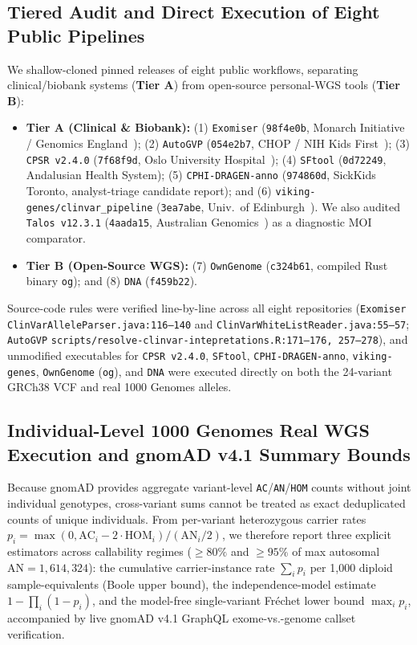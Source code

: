 \documentclass[11pt,letterpaper]{article}
\begin{document}
\subsection{Tiered Audit and Direct Execution of Eight Public Pipelines}
We shallow-cloned pinned releases of eight public workflows, separating clinical/biobank systems (\textbf{Tier A}) from open-source personal-WGS tools (\textbf{Tier B}):
\begin{itemize}\setlength{\itemsep}{1.5pt}
  \item \textbf{Tier A (Clinical \& Biobank):} (1) \texttt{Exomiser} (\texttt{98f4e0b}, Monarch Initiative / Genomics England~\citep{smedley2015exomiser}); (2) \texttt{AutoGVP} (\texttt{054e2b7}, CHOP / NIH Kids First~\citep{kim2024autogvp}); (3) \texttt{CPSR v2.4.0} (\texttt{7f68f9d}, Oslo University Hospital~\citep{nakken2021cpsr}); (4) \texttt{SFtool} (\texttt{0d72249}, Andalusian Health System); (5) \texttt{CPHI-DRAGEN-anno} (\texttt{974860d}, SickKids Toronto, analyst-triage candidate report); and (6) \texttt{viking-genes/clinvar\_pipeline} (\texttt{3ea7abe}, Univ.\ of Edinburgh~\citep{kerr2025viking}). We also audited \texttt{Talos v12.3.1} (\texttt{4aada15}, Australian Genomics~\citep{welland2026talos}) as a diagnostic MOI comparator.
  \item \textbf{Tier B (Open-Source WGS):} (7) \texttt{OwnGenome} (\texttt{c324b61}, compiled Rust binary \texttt{og}); and (8) \texttt{DNA} (\texttt{f459b22}).
\end{itemize}
Source-code rules were verified line-by-line across all eight repositories (\texttt{Exomiser} \texttt{ClinVarAlleleParser.java:116--140} and \texttt{ClinVarWhiteListReader.java:55--57}; \texttt{AutoGVP} \texttt{scripts/\allowbreak resolve-clinvar-intepretations.R:171--176, 257--278}), and unmodified executables for \texttt{CPSR v2.4.0}, \texttt{SFtool}, \texttt{CPHI-DRAGEN-anno}, \texttt{viking-genes}, \texttt{OwnGenome} (\texttt{og}), and \texttt{DNA} were executed directly on both the 24-variant GRCh38 VCF and real 1000 Genomes alleles.

\subsection{Individual-Level 1000 Genomes Real WGS Execution and gnomAD v4.1 Summary Bounds}
Because gnomAD provides aggregate variant-level \texttt{AC}/\texttt{AN}/\texttt{HOM} counts without joint individual genotypes, cross-variant sums cannot be treated as exact deduplicated counts of unique individuals. From per-variant heterozygous carrier rates $p_i = \max(0,\text{AC}_i - 2\cdot\text{HOM}_i)/(\text{AN}_i/2)$, we therefore report three explicit estimators across callability regimes ($\ge 80\%$ and $\ge 95\%$ of max autosomal $\text{AN}=1{,}614{,}324$): the cumulative carrier-instance rate $\sum_i p_i$ per 1,000 diploid sample-equivalents (Boole upper bound), the independence-model estimate $1-\prod_i(1-p_i)$, and the model-free single-variant Fr\'{e}chet lower bound $\max_i p_i$, accompanied by live gnomAD v4.1 GraphQL exome-vs.-genome callset verification.
\end{document}
